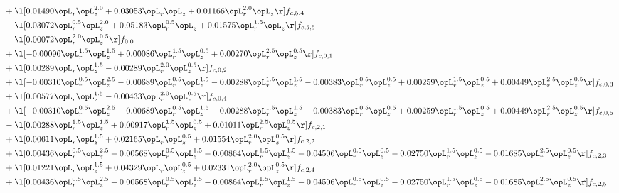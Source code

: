 \begin{alignat}{2}
& + \l[  0.01490 \opL_r \opL_z^{2.0} +  0.03053 \opL_r \opL_z +  0.01166 \opL_r^{2.0} \opL_z  \r] f_{c,5,4} \nonumber \\ 
& - \l[  0.03072 \opL_r^{0.5} \opL_z^{2.0} +  0.05183 \opL_r^{0.5} \opL_z +  0.01575 \opL_r^{1.5} \opL_z  \r] f_{c,5,5} \nonumber \\ 
& - \l[  0.00072 \opL_r^{2.0} \opL_z^{0.5}  \r] f_{0,0} \nonumber \\ 
& + \l[  -0.00096 \opL_r^{1.5} \opL_z^{1.5} +  0.00086 \opL_r^{1.5} \opL_z^{0.5} +  0.00270 \opL_r^{2.5} \opL_z^{0.5}  \r] f_{c,0,1} \nonumber \\ 
& + \l[  0.00289 \opL_r \opL_z^{1.5}   -0.00289 \opL_r^{2.0} \opL_z^{0.5}  \r] f_{c,0,2} \nonumber \\ 
& + \l[  -0.00310 \opL_r^{0.5} \opL_z^{2.5}   -0.00689 \opL_r^{0.5} \opL_z^{1.5}   -0.00288 \opL_r^{1.5} \opL_z^{1.5}   -0.00383 \opL_r^{0.5} \opL_z^{0.5} +  0.00259 \opL_r^{1.5} \opL_z^{0.5} +  0.00449 \opL_r^{2.5} \opL_z^{0.5}  \r] f_{c,0,3} \nonumber \\ 
& + \l[  0.00577 \opL_r \opL_z^{1.5}   -0.00433 \opL_r^{2.0} \opL_z^{0.5}  \r] f_{c,0,4} \nonumber \\ 
& + \l[  -0.00310 \opL_r^{0.5} \opL_z^{2.5}   -0.00689 \opL_r^{0.5} \opL_z^{1.5}   -0.00288 \opL_r^{1.5} \opL_z^{1.5}   -0.00383 \opL_r^{0.5} \opL_z^{0.5} +  0.00259 \opL_r^{1.5} \opL_z^{0.5} +  0.00449 \opL_r^{2.5} \opL_z^{0.5}  \r] f_{c,0,5} \nonumber \\ 
& - \l[  0.00288 \opL_r^{1.5} \opL_z^{1.5} +  0.00917 \opL_r^{1.5} \opL_z^{0.5} +  0.01011 \opL_r^{2.5} \opL_z^{0.5}  \r] f_{c,2,1} \nonumber \\ 
& + \l[  0.00611 \opL_r \opL_z^{1.5} +  0.02165 \opL_r \opL_z^{0.5} +  0.01554 \opL_r^{2.0} \opL_z^{0.5}  \r] f_{c,2,2} \nonumber \\ 
& + \l[  0.00436 \opL_r^{0.5} \opL_z^{2.5}   -0.00568 \opL_r^{0.5} \opL_z^{1.5}   -0.00864 \opL_r^{1.5} \opL_z^{1.5}   -0.04506 \opL_r^{0.5} \opL_z^{0.5}   -0.02750 \opL_r^{1.5} \opL_z^{0.5}   -0.01685 \opL_r^{2.5} \opL_z^{0.5}  \r] f_{c,2,3} \nonumber \\ 
& + \l[  0.01221 \opL_r \opL_z^{1.5} +  0.04329 \opL_r \opL_z^{0.5} +  0.02331 \opL_r^{2.0} \opL_z^{0.5}  \r] f_{c,2,4} \nonumber \\ 
& + \l[  0.00436 \opL_r^{0.5} \opL_z^{2.5}   -0.00568 \opL_r^{0.5} \opL_z^{1.5}   -0.00864 \opL_r^{1.5} \opL_z^{1.5}   -0.04506 \opL_r^{0.5} \opL_z^{0.5}   -0.02750 \opL_r^{1.5} \opL_z^{0.5}   -0.01685 \opL_r^{2.5} \opL_z^{0.5}  \r] f_{c,2,5} \nonumber \\ 

\end{alignat}
